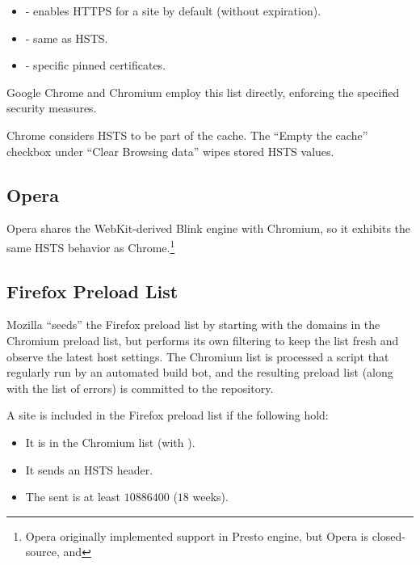 \documentclass{acm_proc_article-sp}
\begin{document}
{\begin{itemize}
\item {} - enables HTTPS for a site by default (without expiration).
\item {\iSD} - same as HSTS.
\item {} - specific pinned certificates.
\end{itemize}

Google Chrome and Chromium employ this list directly, enforcing the specified security measures.

Chrome considers HSTS to be part of the cache. The ``Empty the cache'' checkbox under ``Clear Browsing data'' wipes stored HSTS values.

\subsection{Opera}

Opera shares the WebKit-derived Blink engine with Chromium, so it exhibits the same HSTS behavior as Chrome.\footnote{Opera originally implemented support in Presto engine\cite{opera}, but Opera is closed-source, and }

\subsection{Firefox Preload List}

Mozilla ``seeds'' the Firefox preload list by starting with the domains in the Chromium preload list, but performs its own filtering to keep the list fresh and observe the latest host settings. The Chromium list is processed a script\cite{firefox-script} that regularly run \cite{firefox-cron-script} by an automated build bot\cite{firefox-cron}, and the resulting preload list\cite{firefox-list} (along with the list of errors\cite{firefox-errors}) is committed to the  repository.

A site is included in the Firefox preload list if the following hold:

\begin{itemize}
\item It is in the Chromium list (with ).
\item It sends an HSTS header.
\item The  sent is at least $10886400$ ($18$ weeks).
\end{itemize}

}
\end{document}
